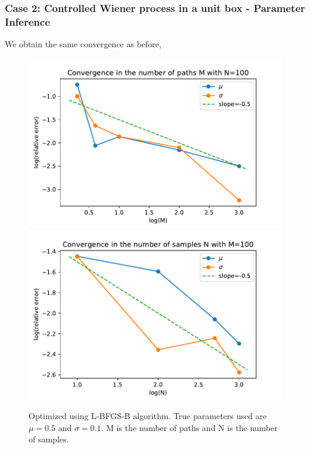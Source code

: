 \documentclass[aspectratio=169]{beamer}\usepackage[utf8]{inputenc}
\begin{document}
\begin{frame}\frametitle{Case 2: Controlled Wiener process in a unit box - Parameter Inference }

We obtain the same convergence as before,

\begin{figure}
  \includegraphics[scale=0.5]{Figures/conv_M_box.pdf}
   \includegraphics[scale=0.5]{Figures/conv_N_box.pdf}
  \caption{Optimized using L-BFGS-B algorithm. True parameters used are $\mu = 0.5$ and $\sigma = 0.1$. M is the number of paths and N is the number of samples.   }
\end{figure}

\end{frame}
\end{document}
